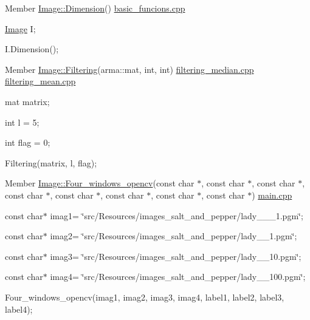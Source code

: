 \label{test__test000006}
\hypertarget{test__test000006}{}
 
\begin{DoxyDescription}
\item[Member \hyperlink{classImage_a900a9e62aa5bb9cc3c20c9d824a95ef3}{Image::Dimension}() ]\hyperlink{basic__funcions_8cpp}{basic\_\-funcions.cpp} \par
 \hyperlink{classImage}{Image} I; \par
 I.Dimension(); 
\end{DoxyDescription}

\label{test__test000014}
\hypertarget{test__test000014}{}
 
\begin{DoxyDescription}
\item[Member \hyperlink{classImage_ad8b8a074b29c240d791859b2b4f7115a}{Image::Filtering}(arma::mat, int, int) ]\hyperlink{filtering__median_8cpp}{filtering\_\-median.cpp} \hyperlink{filtering__mean_8cpp}{filtering\_\-mean.cpp} \par
 mat matrix; \par
 int l = 5; \par
 int flag = 0; \par
 Filtering(matrix, l, flag); 
\end{DoxyDescription}

\label{test__test000001}
\hypertarget{test__test000001}{}
 
\begin{DoxyDescription}
\item[Member \hyperlink{classImage_a359478a1e745b5da4ce47105ef0be14a}{Image::Four\_\-windows\_\-opencv}(const char $\ast$, const char $\ast$, const char $\ast$, const char $\ast$, const char $\ast$, const char $\ast$, const char $\ast$, const char $\ast$) ]\hyperlink{main_8cpp}{main.cpp} \par
 const char$\ast$ imag1= \char`\"{}src/Resources/images\_\-salt\_\-and\_\-pepper/lady\_\_\_\-1.pgm\char`\"{}; \par
 const char$\ast$ imag2= \char`\"{}src/Resources/images\_\-salt\_\-and\_\-pepper/lady\_\_\-1.pgm\char`\"{}; \par
 const char$\ast$ imag3= \char`\"{}src/Resources/images\_\-salt\_\-and\_\-pepper/lady\_\_\-10.pgm\char`\"{}; \par
 const char$\ast$ imag4= \char`\"{}src/Resources/images\_\-salt\_\-and\_\-pepper/lady\_\_\-100.pgm\char`\"{}; \par
 Four\_\-windows\_\-opencv(imag1, imag2, imag3, imag4, label1, label2, label3, label4); 
\end{DoxyDescription}


